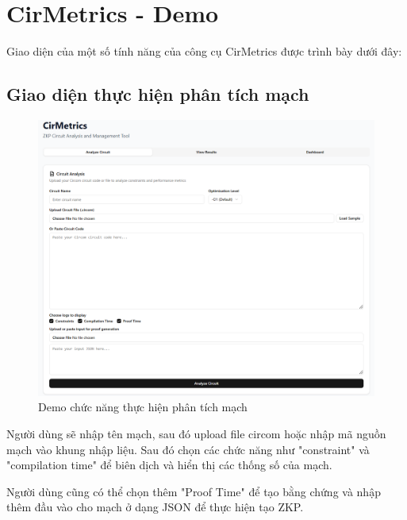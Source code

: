 \section{CirMetrics - Demo}
Giao diện của một số tính năng của công cụ CirMetrics được trình bày dưới đây:
\subsection{Giao diện thực hiện phân tích mạch}
\begin{figure}[H]
    \centering
    \includegraphics[width=\textwidth]{imgs/analyzescreen.png}
    \caption{Demo chức năng thực hiện phân tích mạch}
    \label{fig:chapter6-analyzescreen}
\end{figure}

Người dùng sẽ nhập tên mạch, sau đó upload file circom hoặc nhập mã nguồn mạch vào khung nhập liệu. Sau đó chọn các chức năng như "constraint" và "compilation time" để biên dịch và hiển thị các thống số của mạch. 

Người dùng cũng có thể chọn thêm "Proof Time" để tạo bằng chứng và nhập thêm đầu vào cho mạch ở dạng JSON để thực hiện tạo ZKP.


